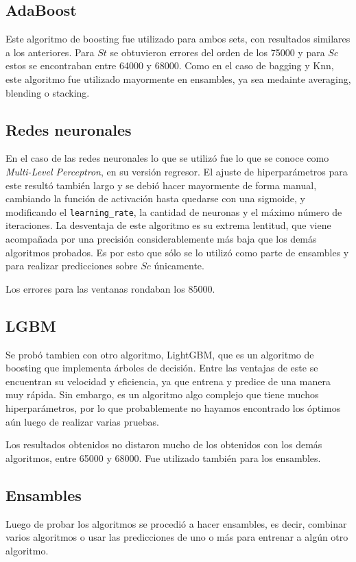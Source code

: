 \documentclass[a4paper, 12pt]{article}
\begin{document}
\subsection{AdaBoost}
Este algoritmo de boosting fue utilizado para ambos sets, con resultados similares a los anteriores. Para $St$ se obtuvieron errores del orden de los 75000 y para $Sc$ estos se encontraban entre 64000 y 68000. Como en el caso de bagging y Knn, este algoritmo fue utilizado mayormente en ensambles, ya sea medainte averaging, blending o stacking.

\subsection{Redes neuronales}
En el caso de las redes neuronales lo que se utilizó fue lo que se conoce como \textit{Multi-Level Perceptron}, en su versión regresor. El ajuste de hiperparámetros para este resultó también largo y se debió hacer mayormente de forma manual, cambiando la función de activación hasta quedarse con una sigmoide, y modificando el \texttt{learning\_}\texttt{rate}, la cantidad de neuronas y el máximo número de iteraciones. La desventaja de este algoritmo es su extrema lentitud, que viene acompañada por una precisión considerablemente más baja que los demás algoritmos probados. Es por esto que sólo se lo utilizó como parte de ensambles y para realizar predicciones sobre $Sc$ únicamente.

Los errores para las ventanas rondaban los 85000.

\subsection{LGBM}
Se probó tambien con otro algoritmo, LightGBM, que es un algoritmo de boosting que implementa árboles de decisión. Entre las ventajas de este se encuentran su velocidad y eficiencia, ya que entrena y predice de una manera muy rápida. Sin embargo, es un algoritmo algo complejo que tiene muchos hiperparámetros, por lo que probablemente no hayamos encontrado los óptimos aún luego de realizar varias pruebas. 

Los resultados obtenidos no distaron mucho de los obtenidos con los demás algoritmos, entre 65000 y 68000.
Fue utilizado también para los ensambles.

\subsection{Ensambles}
Luego de probar los algoritmos se procedió a hacer ensambles, es decir, combinar varios algoritmos o usar las predicciones de uno o más para entrenar a algún otro algoritmo.
\end{document}
